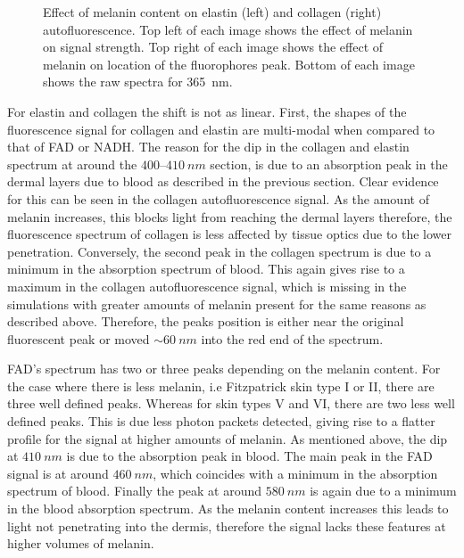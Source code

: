 \begin{figure}[!htbp]
    \centering
    \caption{Effect of melanin content on elastin (left) and collagen (right) autofluorescence. Top left of each image shows the effect of melanin on signal strength. Top right of each image shows the effect of melanin on location of the fluorophores peak. Bottom of each image shows the raw spectra for 365~nm.}%
    \label{fig:elscol-mel}%
\end{figure}

For elastin and collagen the shift is not as linear.
First, the shapes of the fluorescence signal for collagen and elastin are multi-modal when compared to that of FAD or NADH\@.
The reason for the dip in the collagen and elastin spectrum at around the $400$--$410~nm$ section, is due to an absorption peak in the dermal layers due to blood as described in the previous section.
Clear evidence for this can be seen in the collagen autofluorescence signal.
As the amount of melanin increases, this blocks light from reaching the dermal layers therefore, the fluorescence spectrum of collagen is less affected by tissue optics due to the lower penetration.
Conversely, the second peak in the collagen spectrum is due to a minimum in the absorption spectrum of blood.
This again gives rise to a maximum in the collagen autofluorescence signal, which is missing in the simulations with greater amounts of melanin present for the same reasons as described above.
Therefore, the peaks position is either near the original fluorescent peak or moved $\sim 60~nm$ into the red end of the spectrum.

FAD's spectrum has two or three peaks depending on the melanin content.
For the case where there is less melanin, i.e Fitzpatrick skin type I or II, there are three well defined peaks.
Whereas for skin types V and VI, there are two less well defined peaks.
This is due less photon packets detected, giving rise to a flatter profile for the signal at higher amounts of melanin.
As mentioned above, the dip at $410~nm$ is due to the absorption peak in blood. 
The main peak in the FAD signal is at around $460~nm$, which coincides with a minimum in the absorption spectrum of blood.
Finally the peak at around $580~nm$ is again due to a minimum in the blood absorption spectrum.
As the melanin content increases this leads to light not penetrating into the dermis, therefore the signal lacks these features at higher volumes of melanin.

